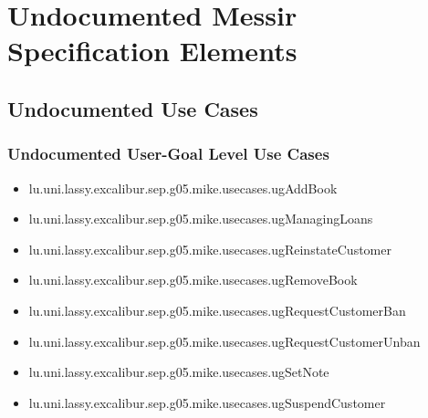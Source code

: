 	
\chapter{Undocumented Messir Specification Elements}


\section[Undocumented Use Cases]{Undocumented Use Cases}


\subsection[Undocumented Use Cases - User-Goal Level]{Undocumented User-Goal Level Use Cases}
\begin{itemize}
\item lu.uni.lassy.excalibur.sep.g05.mike.usecases.ugAddBook 
\item lu.uni.lassy.excalibur.sep.g05.mike.usecases.ugManagingLoans 
\item lu.uni.lassy.excalibur.sep.g05.mike.usecases.ugReinstateCustomer 
\item lu.uni.lassy.excalibur.sep.g05.mike.usecases.ugRemoveBook 
\item lu.uni.lassy.excalibur.sep.g05.mike.usecases.ugRequestCustomerBan 
\item lu.uni.lassy.excalibur.sep.g05.mike.usecases.ugRequestCustomerUnban 
\item lu.uni.lassy.excalibur.sep.g05.mike.usecases.ugSetNote 
\item lu.uni.lassy.excalibur.sep.g05.mike.usecases.ugSuspendCustomer 
\end{itemize}

